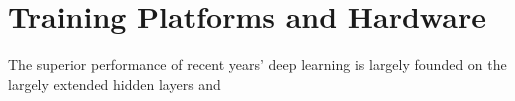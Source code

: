 \section{Training Platforms and Hardware}
The superior performance of recent years' deep learning is largely founded on the largely extended hidden layers and 